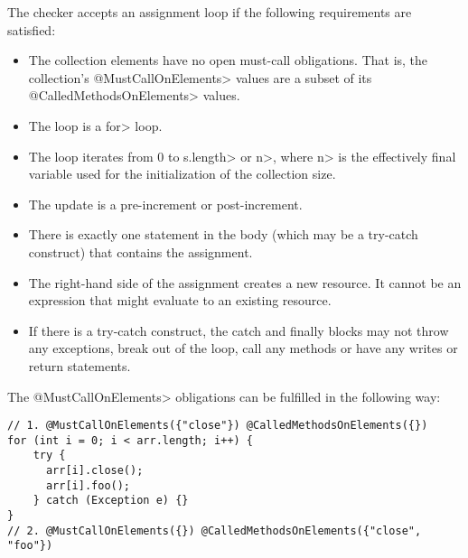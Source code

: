 The checker accepts an assignment loop if the following requirements are satisfied:

\begin{itemize}
  \item The collection elements have no open must-call obligations.  That
  is, the collection's \<@MustCallOnElements> values are a subset of its
  \<@CalledMethodsOnElements> values.
  \item The loop is a \<for> loop.
  \item The loop iterates from 0 to \<s.length> or \<n>, where \<n> is the effectively final variable used for the initialization of the collection size.
  \item The update is a pre-increment or post-increment.
  \item There is exactly one statement in the body (which may be a try-catch construct) that contains the assignment.
  \item The right-hand side of the assignment creates a new resource.
  It cannot be an expression that might evaluate to an existing resource.
  \item If there is a try-catch construct, the catch and finally blocks may not throw any exceptions, break out of the loop, call any methods or have any writes or return statements.
\end{itemize}




The \<@MustCallOnElements> obligations can be fulfilled in the following way:
\begin{verbatim}
// 1. @MustCallOnElements({"close"}) @CalledMethodsOnElements({})
for (int i = 0; i < arr.length; i++) {
    try {
      arr[i].close();
      arr[i].foo();
    } catch (Exception e) {}
}
// 2. @MustCallOnElements({}) @CalledMethodsOnElements({"close", "foo"})
\end{verbatim}

